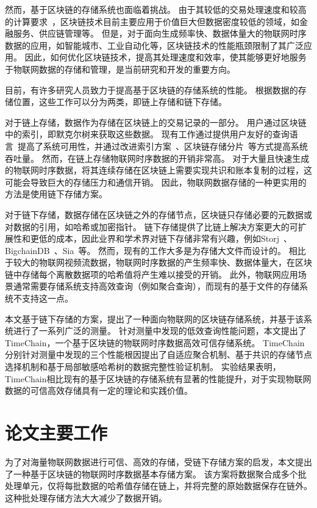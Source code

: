 然而，基于区块链的存储系统也面临着挑战。
由于其较低的交易处理速度和较高的计算要求~\cite{dorri2017towards}，区块链技术目前主要应用于价值巨大但数据密度较低的领域，如金融服务、供应链管理等。
但是，对于面向生成频率快、数据体量大的物联网时序数据的应用，如智能城市、工业自动化等，区块链技术的性能瓶颈限制了其广泛应用。
因此，如何优化区块链技术，提高其处理速度和效率，使其能够更好地服务于物联网数据的存储和管理，是当前研究和开发的重要方向。

目前，有许多研究人员致力于提高基于区块链的存储系统的性能。
根据数据的存储位置，这些工作可以分为两类，即链上存储和链下存储。

对于链上存储，数据作为存储在区块链上的交易记录的一部分。
用户通过区块链中的索引，即默克尔树来获取这些数据。
现有工作通过提供用户友好的查询语言~\cite{zhu2019sebdb,xu2019vchain,wang2022vchain+}提高了系统可用性，并通过改进索引方案~\cite{li2023lvmt,zhang2024cole}、区块链存储分片~\cite{zamani2018rapidchain,hong2023gridb,el2019blockchaindb}等方式提高系统吞吐量。
然而，在链上存储物联网时序数据的开销非常高。
对于大量且快速生成的物联网时序数据，将其连续存储在区块链上需要实现共识和账本复制的过程，这可能会导致巨大的存储压力和通信开销。
因此，物联网数据存储的一种更实用的方法是使用链下存储方案。

对于链下存储，数据存储在区块链之外的存储节点，区块链只存储必要的元数据或对数据的引用，如哈希或加密指针。
链下存储提供了比链上解决方案更大的可扩展性和更低的成本，因此业界和学术界对链下存储非常有兴趣，例如Storj~\cite{storj2018storj}、BigchainDB~\cite{mcconaghy2016bigchaindb}、Sia~\cite{sia}等。
然而，现有的工作大多是为存储大文件而设计的。
相比于较大的物联网视频流数据，物联网时序数据的产生频率快、数据体量大，在区块链中存储每个离散数据项的哈希值将产生难以接受的开销。
此外，物联网应用场景通常需要存储系统支持高效查询（例如聚合查询），而现有的基于文件的存储系统不支持这一点。

本文基于链下存储的方案，提出了一种面向物联网的区块链存储系统，并基于该系统进行了一系列广泛的测量。
针对测量中发现的低效查询性能问题，本文提出了TimeChain，一个基于区块链的物联网时序数据高效可信存储系统。
TimeChain分别针对测量中发现的三个性能根因提出了自适应聚合机制、基于共识的存储节点选择机制和基于局部敏感哈希树的数据完整性验证机制。
实验结果表明，TimeChain相比现有的基于区块链的存储系统有显著的性能提升，对于实现物联网数据的可信高效存储具有一定的理论和实践价值。

\section{论文主要工作}
为了对海量物联网数据进行可信、高效的存储，受链下存储方案的启发，本文提出了一种基于区块链的物联网时序数据基本存储方案。
该方案将数据聚合成多个批处理单元，仅将每批数据的哈希值存储在链上，并将完整的原始数据保存在链外。
这种批处理存储方法大大减少了数据开销。

